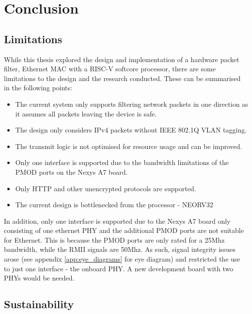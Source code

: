 \chapter[Conclusion]{Conclusion}
\label{Chap:Conclusion}


\section{Limitations}
While this thesis explored the design and implementation of a hardware packet filter, Ethernet MAC with a RISC-V softcore processor, there are some limitations to the design and the research conducted. These can be summarised in the following points:


\begin{itemize}
    \item The current system only supports filtering network packets in one direction as it assumes all packets leaving the device is safe. 
    \item The design only considers IPv4 packets without IEEE 802.1Q VLAN tagging.
    \item The transmit logic is not optimised for resource usage and can be improved.
    \item Only one interface is supported due to the bandwidth limitations of the PMOD ports on the Nexys A7 board.
    \item Only HTTP and other unencrypted protocols are supported.
    \item The current design is bottlenecked from the processor - NEORV32
\end{itemize}


In addition, only one interface is supported due to the Nexys A7 board only consisting of one ethernet PHY and the additional PMOD ports are not suitable for Ethernet. This is because the PMOD ports are only rated for a 25Mhz bandwidth, while the RMII signals are 50Mhz. As such, signal integrity issues arose (see appendix \ref{app:eye_diagrams} for eye diagram) and restricted the use to just one interface - the onboard PHY. A new development board with two PHYs would be needed.











\section{Sustainability}



